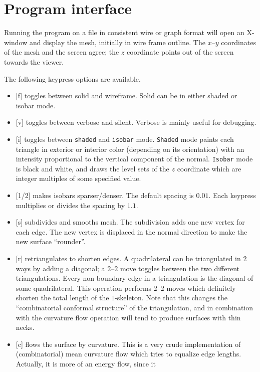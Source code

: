\documentclass[12pt]{article}
\begin{document}
\section{Program interface}\label{section:interface}

Running the program on a file in consistent wire or graph format will open an X-window
and display the mesh, initially in wire frame outline. The $x$--$y$ coordinates of the
mesh and the screen agree; the $z$ coordinate points out of the screen towards the viewer.

The following keypress options are available.

\begin{itemize}
\item{[f] toggles between solid and wireframe. Solid can be in either shaded or isobar mode.}
\item{[v] toggles between verbose and silent. Verbose is mainly useful for debugging.}
\item{[i] toggles between {\tt shaded} and {\tt isobar} mode. {\tt Shaded} mode paints each triangle in 
exterior or interior color (depending on its orientation) with an intensity proportional to the
vertical component of the normal. {\tt Isobar} mode is black and white, and draws the level
sets of the $z$ coordinate which are integer multiples of some specified value.}
\item{[1/2] makes isobars sparser/denser. The default spacing is $0.01$. Each keypress multiplies
or divides the spacing by $1.1$.}
\item{[s] subdivides and smooths mesh. The subdivision adds one new vertex for each edge. The new vertex
is displaced in the normal direction to make the new surface ``rounder''.}
\item{[r] retriangulates to shorten edges. A quadrilateral can be triangulated in 2 ways by adding
a diagonal; a $2$--$2$ move toggles between the two different triangulations. Every non-boundary edge
in a triangulation is the diagonal of some quadrilateral. This operation performs $2$--$2$ moves which
definitely shorten the total length of the $1$-skeleton. Note that this changes the ``combinatorial
conformal structure'' of the triangulation, and in combination with the curvature flow operation
will tend to produce surfaces with thin necks.}
\item{[c] flows the surface by curvature. This is a very crude implementation of (combinatorial) mean
curvature flow which tries to equalize edge lengths. Actually, it is more of an energy flow, since it
}
\end{itemize}
\end{document}
